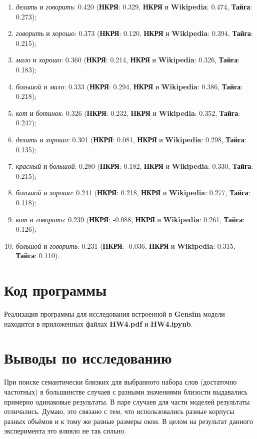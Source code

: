 \documentclass[oneside,final,12pt]{article}
\begin{document}
\begin{enumerate}
	\item \textit{делать} и \textit{говорить}: 0.420 (\textbf{НКРЯ}: 0.329, \textbf{НКРЯ} и \textbf{Wikipedia}: 0.474, \textbf{Тайга}: 0.273);
	\item \textit{говорить} и \textit{хорошо}: 0.373 (\textbf{НКРЯ}: 0.120, \textbf{НКРЯ} и \textbf{Wikipedia}: 0.394, \textbf{Тайга}: 0.215);
	\item \textit{мало} и \textit{хорошо}: 0.360 (\textbf{НКРЯ}: 0.214, \textbf{НКРЯ} и \textbf{Wikipedia}: 0.326, \textbf{Тайга}: 0.183);
	\item \textit{большой} и \textit{мало}: 0.333 (\textbf{НКРЯ}: 0.294, \textbf{НКРЯ} и \textbf{Wikipedia}: 0.386, \textbf{Тайга}: 0.218);
	\item \textit{кот} и \textit{ботинок}: 0.326 (\textbf{НКРЯ}: 0.232, \textbf{НКРЯ} и \textbf{Wikipedia}: 0.352, \textbf{Тайга}: 0.247);
	\item \textit{делать} и \textit{хорошо}: 0.301 (\textbf{НКРЯ}: 0.081, \textbf{НКРЯ} и \textbf{Wikipedia}: 0.298, \textbf{Тайга}: 0.135);
	\item \textit{красный} и \textit{большой}: 0.280 (\textbf{НКРЯ}: 0.182, \textbf{НКРЯ} и \textbf{Wikipedia}: 0.330, \textbf{Тайга}: 0.215);
	\item \textit{большой} и \textit{хорошо}: 0.241 (\textbf{НКРЯ}: 0.218, \textbf{НКРЯ} и \textbf{Wikipedia}: 0.277, \textbf{Тайга}: 0.118);
	\item \textit{кот} и \textit{говорить}: 0.239 (\textbf{НКРЯ}: -0.088, \textbf{НКРЯ} и \textbf{Wikipedia}: 0.261, \textbf{Тайга}: 0.126);
	\item \textit{большой} и \textit{говорить}: 0.231 (\textbf{НКРЯ}: -0.036, \textbf{НКРЯ} и \textbf{Wikipedia}: 0.315, \textbf{Тайга}: 0.110).
\end{enumerate}

\section{Код программы}

Реализация программы для исследования встроенной в \textbf{Gensim} модели находится в приложенных файлах \textbf{HW4.pdf} и \textbf{HW4.ipynb}.
\clearpage

\section{Выводы по исследованию}

При поиске семантически близких для выбранного набора слов (достаточно частотных) в большинстве случаев с разными значениями близости выдавались примерно одинаковые результаты. В паре случаев для части моделей результаты отличались. Думаю, это связано с тем, что использовались разные корпусы разных объёмов и к тому же разные размеры окон. В целом на результат данного эксперимента это влияло не так сильно.
\end{document}
